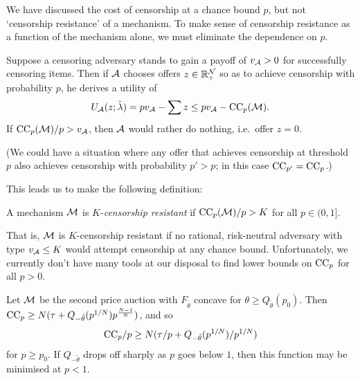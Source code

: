 We have discussed the cost of censorship at a chance bound $p$, but not `censorship resistance' of a mechanism.
%
To make sense of censorship resistance as a function of the mechanism alone, we must eliminate the dependence on $p$.

Suppose a censoring adversary stands to gain a payoff of $v_{\mathcal{A}}>0$ for successfully censoring items.
%
Then if $\mathcal{A}$ chooses offers $z\in\mathbb{R}_+^{\mathcal{N}}$ so as to achieve censorship with probability $p$, he derives a utility of
%
\[
  U_{\mathcal{A}}(z;\bar{\lambda}) = pv_{\mathcal{A}} - \sum z \leq pv_{\mathcal{A}} - \mathrm{CC}_{p}(\mathcal{M}).
\]
%
If $\mathrm{CC}_{p}(\mathcal{M})/p > v_{\mathcal{A}}$, then $\mathcal{A}$ would rather do nothing, i.e.~offer $z=0$.

(We could have a situation where any offer that achieves censorship at threshold $p$ also achieves censorship with probability $p'>p$; in this case $\mathrm{CC}_{p'}=\mathrm{CC}_{p}$.)

This leads us to make the following definition:
%
\begin{definition}

  A mechanism $\mathcal{M}$ is $K$-\emph{censorship resistant} if $\mathrm{CC}_{p}(\mathcal{M})/p>K$ for all $p\in(0,1]$.

\end{definition}
%
That is, $\mathcal{M}$ is $K$-censorship resistant if no rational, risk-neutral adversary with type $v_{\mathcal{A}}\leq K$ would attempt censorship at any chance bound.
%
Unfortunately, we currently don't have many tools at our disposal to find lower bounds on $\mathrm{CC}_{p}$ for all $p>0$.

\begin{example}

  Let $\mathcal{M}$ be the second price auction with $F_{\tilde\theta}$ concave for $\theta\geq Q_{\tilde\theta}(p_0)$.
  Then $\mathrm{CC}_{p} \geq N(\tau + Q_{-\tilde\theta}(p^{1/N})p^{\frac{N-1}{N}})$, and so
  \[
    \mathrm{CC}_{p}/p \geq N(\tau/p + Q_{-\tilde\theta}(p^{1/N})/p^{1/N})
  \]
  for $p\geq p_0$.
  If $Q_{-\tilde\theta}$ drops off sharply as $p$ goes below $1$, then this function may be minimised at $p<1$.

\end{example}

